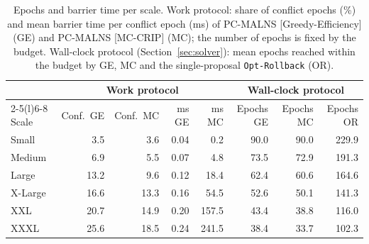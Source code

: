 \begin{table}[pos=H]
\centering
\caption{Epochs and barrier time per scale. Work protocol: share of conflict epochs (\%) and mean barrier time per conflict epoch (ms) of PC-MALNS [Greedy-Efficiency] (GE) and PC-MALNS [MC-CRIP] (MC); the number of epochs is fixed by the budget. Wall-clock protocol (Section~\ref{sec:solver}): mean epochs reached within the budget by GE, MC and the single-proposal \texttt{Opt-Rollback} (OR).}
\label{tab:barrier}
\footnotesize
\begin{tabular}{@{}lrrrrrrr@{}}
\toprule
 & \multicolumn{4}{c}{Work protocol} & \multicolumn{3}{c}{Wall-clock protocol} \\
\cmidrule(lr){2-5}\cmidrule(l){6-8}
Scale & Conf.\ GE & Conf.\ MC & ms GE & ms MC & Epochs GE & Epochs MC & Epochs OR \\
\midrule
Small & 3.5 & 3.6 & 0.04 & 0.2 & 90.0 & 90.0 & 229.9 \\
Medium & 6.9 & 5.5 & 0.07 & 4.8 & 73.5 & 72.9 & 191.3 \\
Large & 13.2 & 9.6 & 0.12 & 18.4 & 62.4 & 60.6 & 164.6 \\
X-Large & 16.6 & 13.3 & 0.16 & 54.5 & 52.6 & 50.1 & 141.3 \\
XXL & 20.7 & 14.9 & 0.20 & 157.5 & 43.4 & 38.8 & 116.0 \\
XXXL & 25.6 & 18.5 & 0.24 & 241.5 & 38.4 & 33.7 & 102.3 \\
\bottomrule
\end{tabular}
\end{table}
